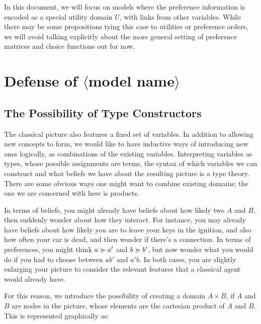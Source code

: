 \documentclass{article}
\newcommand\modelname{{\color{green!50!black}$\langle$model name$\rangle$ }}
\begin{document}
	
	
	In this document, we will focus on models where the preference information is encoded as a special utility domain $U$, with links from other variables. While there may be some propositions tying this case to utilities or preference orders, we will avoid talking explicitly about the more general setting of preference matrices and choice functions out for now.
	
	
	\section{Defense of \modelname }
	\subsection{The Possibility of Type Constructors}\label{sec:belief-typing}
	The classical picture also features a fixed set of variables. In addition to allowing new concepts to form, we would like to have inductive ways of introducing new ones logically, as combinations of the existing variables. Interpreting variables as types, whose possible assignments are terms, the syntax of which variables we can construct and what beliefs we have about the resulting picture is a type theory. There are some obvious ways one might want to combine existing domains; the one we are concerned with here is products.
	
	In terms of beliefs, you might already have beliefs about how likely two  $A$ and $B$, then suddenly wonder about how they interact. For instance, you may already have beliefs about how likely you are to leave your keys in the ignition, and also how often your car is dead, and then wonder if there's a connection. 
	In terms of preferences, you might think $a \succcurlyeq a'$ and $b \succcurlyeq b'$, but now wonder what you would do if you had to choose between $a b'$ and $a' b$. In both cases, you are slightly enlarging your picture to consider the relevant features that a classical agent would already have.
	
	For this reason, we introduce the possibility of creating a domain $A \times B$, if $A$ and $B$ are nodes in the picture, whose elements are the cartesian product of $A$ and $B$. %
	This is represented graphically as:
	\begin{center}
	\end{center}
	
\end{document}
